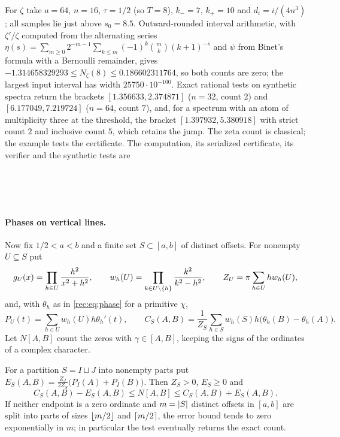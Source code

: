 \begin{example}\label{rec:ex:count8}
For $\zeta$ take $a=64$, $n=16$, $\tau=1/2$ (so $T=8$), $k_-=7$, $k_+=10$ and $d_i=i/(4n^3)$;
all samples lie just above $s_0=8.5$. Outward-rounded interval arithmetic, with $\zeta'/\zeta$
computed from the alternating series $\eta(s)=\sum_{m\ge0}2^{-m-1}\sum_{k\le m}(-1)^k\binom mk(k+1)^{-s}$
and $\psi$ from Binet's formula with a Bernoulli remainder, gives
$-1.314658329293\le N_\zeta(8)\le0.186602311764$, so both counts are zero; the largest input
interval has width $25750\cdot10^{-100}$. Exact rational tests on synthetic spectra return the
brackets $[1.356633,2.374871]$ ($n=32$, count $2$) and $[6.177049,7.219724]$ ($n=64$, count
$7$), and, for a spectrum with an atom of multiplicity three at the threshold, the bracket
$[1.397932,5.380918]$ with strict count $2$ and inclusive count $5$, which retains the jump. The
zeta count is classical; the example tests the certificate. The computation, its serialized
certificate, its verifier and the synthetic tests are
\begin{center}
\\
\\
\\
\end{center}
\end{example}

\paragraph{Phases on vertical lines.}
Now fix $1/2<a<b$ and a finite set $S\subset[a,b]$ of distinct offsets. For nonempty
$U\subseteq S$ put
\begin{equation}\label{rec:eq:phaseweights}
 g_U(x)=\prod_{h\in U}\frac{h^2}{x^2+h^2},\qquad
 w_h(U)=\prod_{k\in U\setminus\{h\}}\frac{k^2}{k^2-h^2},\qquad
 Z_U=\pi\sum_{h\in U}hw_h(U),
\end{equation}
and, with $\theta_h$ as in \eqref{rec:eq:phase} for a primitive $\chi$,
\[
 P_U(t)=\sum_{h\in U}w_h(U)h\theta_h'(t),\qquad
 C_S(A,B)=\frac1{Z_S}\sum_{h\in S}w_h(S)h\bigl(\theta_h(B)-\theta_h(A)\bigr).
\]
Let $N[A,B]$ count the zeros with $\gamma\in[A,B]$, keeping the signs of the ordinates of a
complex character.

\begin{theorem}\label{rec:thm:phasecount}
For a partition $S=I\sqcup J$ into nonempty parts put
$E_S(A,B)=\frac{Z_J}{2Z_S}\bigl(P_I(A)+P_I(B)\bigr)$. Then $Z_S>0$, $E_S\ge0$ and
\[
 C_S(A,B)-E_S(A,B)\le N[A,B]\le C_S(A,B)+E_S(A,B).
\]
If neither endpoint is a zero ordinate and $m=\lvert S\rvert$ distinct offsets in $[a,b]$ are split
into parts of sizes $\lfloor m/2\rfloor$ and $\lceil m/2\rceil$, the error bound tends to zero exponentially
in $m$; in particular the test eventually returns the exact count.
\end{theorem}

